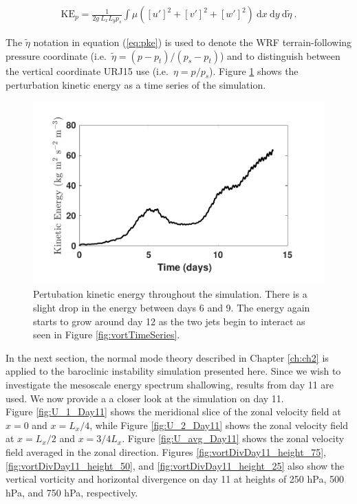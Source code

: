 \begin{align}
\text{KE}_p = \frac{1}{2g ~L_x L_y p_s}\int \mu\left( \left[u'\right]^2 + \left[v'\right]^2 + \left[w'\right]^2\right) ~\text{d}x ~\text{d}y~ \text{d}\tilde{\eta}~. \label{eq:pke}
\end{align}

The $\tilde{\eta}$ notation in equation (\ref{eq:pke}) is used to denote the WRF terrain-following pressure coordinate (i.e.\ $\tilde{\eta} = (p - p_{t})/(p_{s} - p_{t})$) and to distinguish between the vertical coordinate URJ15 use (i.e.\ $\eta = p/p_s$). Figure \ref{fig:pke} shows the perturbation kinetic energy as a time series of the simulation.

\begin{figure}[H]
\includegraphics[scale=1]{Chapter3/img/tke}
\caption{Pertubation kinetic energy throughout the simulation. There is a slight drop in the energy between days 6 and 9. The energy again starts to grow around day 12 as the two jets begin to interact as seen in Figure \ref{fig:vortTimeSeries}.}
\label{fig:pke}
\end{figure}

In the next section, the normal mode theory described in Chapter \ref{ch:ch2} is applied to the baroclinic instability simulation presented here. Since we wish to investigate the mesoscale energy spectrum shallowing, results from day 11 are used. We now provide a a closer look at the simulation on day 11.\\

Figure \ref{fig:U_1_Day11} shows the meridional slice of the zonal velocity field at $x = 0$ and $x = L_x/4$, while Figure \ref{fig:U_2_Day11} shows the zonal velocity field at $x = L_x/2$ and $x = 3/4 L_x$. Figure \ref{fig:U_avg_Day11} shows the zonal velocity field averaged in the zonal direction. Figures \ref{fig:vortDivDay11_height_75}, \ref{fig:vortDivDay11_height_50}, and \ref{fig:vortDivDay11_height_25} also show the vertical vorticity and horizontal divergence on day 11 at heights of 250 hPa, 500 hPa, and 750 hPa, respectively. 


